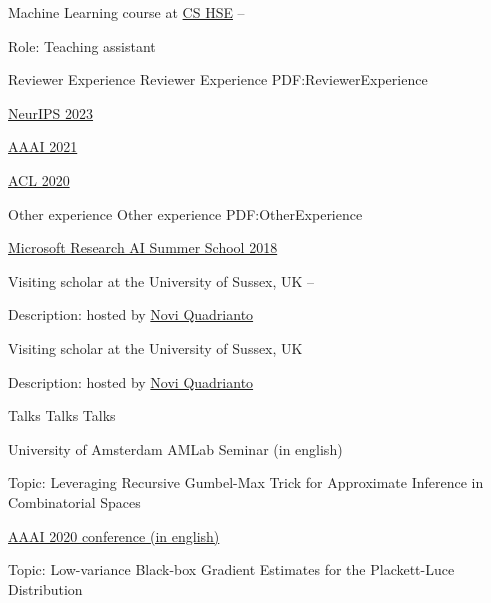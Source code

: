 \documentclass[letterpaper,MMMyyyy,nonstopmode]{simpleresumecv}
\begin{document}
\begin{Body}
\BulletItem
Machine Learning course at \href{https://cs.hse.ru/en/}{CS HSE}
\hfill
{} --
\begin{Detail}
\Item
Role: Teaching assistant
\end{Detail}


\Section
{Reviewer Experience}
{Reviewer Experience}
{PDF:ReviewerExperience}

\BulletItem
\href{https://neurips.cc}{NeurIPS 2023}

\BulletItem
\href{https://aaai.org/Conferences/AAAI-21/}{AAAI 2021}

\BulletItem
\href{https://acl2020.org}{ACL 2020}



\Section
{Other experience}
{Other experience}
{PDF:OtherExperience}

\Gap
\BulletItem
\href{https://www.microsoft.com/en-us/research/event/ai-summer-school-2018/}{Microsoft Research AI Summer School 2018}
\hfill
{}

\BulletItem Visiting scholar at the University of Sussex, UK
\hfill
{} --
\begin{Detail}
\Item
Description: hosted by \href{http://www.sussex.ac.uk/profiles/335583}{Novi Quadrianto}
\end{Detail}

\BulletItem Visiting scholar at the University of Sussex, UK
\hfill
{}
\begin{Detail}
\Item
Description: hosted by \href{http://www.sussex.ac.uk/profiles/335583}{Novi Quadrianto}
\end{Detail}



\Section
{Talks}
{Talks}
{Talks}

\Item
University of Amsterdam AMLab Seminar (in english)
\hfill
{}
\begin{Detail}
\Item
Topic: Leveraging Recursive Gumbel-Max Trick for Approximate Inference in Combinatorial Spaces
\end{Detail}

\Item
\href{https://aaai.org/Conferences/AAAI-20/}{AAAI 2020 conference (in english)}
\hfill
{}
\begin{Detail}
\Item
Topic: Low-variance Black-box Gradient Estimates for the Plackett-Luce Distribution
\end{Detail}


\end{Body}
\end{document}
